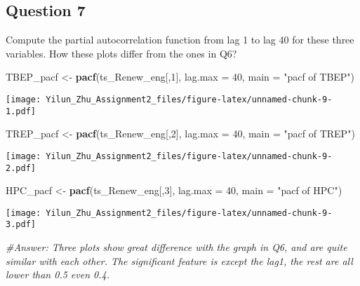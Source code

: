 \documentclass[
]{article}
\newenvironment{Shaded}{\begin{snugshade}}{\end{snugshade}}
\newcommand{\AttributeTok}[1]{\textcolor[rgb]{0.13,0.29,0.53}{#1}}
\newcommand{\CommentTok}[1]{\textcolor[rgb]{0.56,0.35,0.01}{\textit{#1}}}
\newcommand{\DecValTok}[1]{\textcolor[rgb]{0.00,0.00,0.81}{#1}}
\newcommand{\FunctionTok}[1]{\textcolor[rgb]{0.13,0.29,0.53}{\textbf{#1}}}
\newcommand{\NormalTok}[1]{#1}
\newcommand{\OtherTok}[1]{\textcolor[rgb]{0.56,0.35,0.01}{#1}}
\newcommand{\StringTok}[1]{\textcolor[rgb]{0.31,0.60,0.02}{#1}}
\begin{document}
\hypertarget{question-7}{%
\subsection{Question 7}\label{question-7}}

Compute the partial autocorrelation function from lag 1 to lag 40 for
these three variables. How these plots differ from the ones in Q6?

\begin{Shaded}
\begin{Highlighting}[]
\NormalTok{TBEP\_pacf }\OtherTok{\textless{}{-}} \FunctionTok{pacf}\NormalTok{(ts\_Renew\_eng[,}\DecValTok{1}\NormalTok{], }\AttributeTok{lag.max =} \DecValTok{40}\NormalTok{, }\AttributeTok{main =} \StringTok{"pacf of TBEP"}\NormalTok{)}
\end{Highlighting}
\end{Shaded}

\texttt{[image: Yilun\_Zhu\_Assignment2\_files/figure-latex/unnamed-chunk-9-1.pdf]}

\begin{Shaded}
\begin{Highlighting}[]
\NormalTok{TREP\_pacf }\OtherTok{\textless{}{-}} \FunctionTok{pacf}\NormalTok{(ts\_Renew\_eng[,}\DecValTok{2}\NormalTok{], }\AttributeTok{lag.max =} \DecValTok{40}\NormalTok{, }\AttributeTok{main =} \StringTok{"pacf of TREP"}\NormalTok{)}
\end{Highlighting}
\end{Shaded}

\texttt{[image: Yilun\_Zhu\_Assignment2\_files/figure-latex/unnamed-chunk-9-2.pdf]}

\begin{Shaded}
\begin{Highlighting}[]
\NormalTok{HPC\_pacf }\OtherTok{\textless{}{-}} \FunctionTok{pacf}\NormalTok{(ts\_Renew\_eng[,}\DecValTok{3}\NormalTok{], }\AttributeTok{lag.max =} \DecValTok{40}\NormalTok{, }\AttributeTok{main =} \StringTok{"pacf of HPC"}\NormalTok{)}
\end{Highlighting}
\end{Shaded}

\texttt{[image: Yilun\_Zhu\_Assignment2\_files/figure-latex/unnamed-chunk-9-3.pdf]}

\begin{Shaded}
\begin{Highlighting}[]
\CommentTok{\#Answer: Three plots show great difference with the graph in Q6, and are quite similar with each other. The significant feature is except the lag1, the rest are all lower than 0.5 even 0.4.}
\end{Highlighting}
\end{Shaded}
\end{document}
